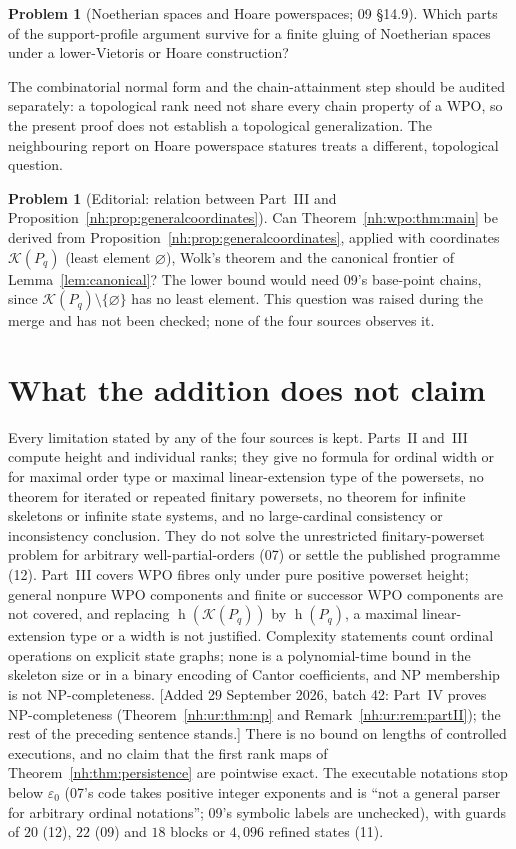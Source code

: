 \documentclass[11pt,a4paper]{article}
\theoremstyle{definition}
\newtheorem{problem}[theorem]{Problem}
\theoremstyle{remark}
\newcommand{\K}{\mathcal K}
\newcommand{\hgt}{\operatorname{h}}
\newcommand{\eps}{\varepsilon_0}
\begin{document}
\begin{problem}[Noetherian spaces and Hoare powerspaces; 09 \S14.9]
\label{nh:prob:noetherian}
Which parts of the support-profile argument survive for a finite gluing of
Noetherian spaces under a lower-Vietoris or Hoare construction?
\end{problem}
The combinatorial normal form and the chain-attainment step should be audited
separately: a topological rank need not share every chain property of a WPO, so the
present proof does not establish a topological generalization. The neighbouring
report on Hoare powerspace statures treats a different, topological question.

\begin{problem}[Editorial: relation between Part~III and Proposition~\ref{nh:prop:generalcoordinates}]
\label{nh:prob:editorial}
Can Theorem~\ref{nh:wpo:thm:main} be derived from
Proposition~\ref{nh:prop:generalcoordinates}, applied with coordinates
$\K(P_q)$ (least element $\varnothing$), Wolk's theorem and the canonical frontier of
Lemma~\ref{lem:canonical}? The lower bound would need 09's base-point chains, since
$\K(P_q)\setminus\{\varnothing\}$ has no least element. This question was raised
during the merge and has not been checked; none of the four sources observes it.
\end{problem}

\section{What the addition does not claim}\label{nh:sec:nonclaims}

Every limitation stated by any of the four sources is kept. Parts~II and~III compute
height and individual ranks; they give no formula for ordinal width or for maximal
order type or maximal linear-extension type of the powersets, no theorem for
iterated or repeated finitary powersets, no theorem for infinite skeletons or
infinite state systems, and no large-cardinal consistency or inconsistency
conclusion. They do not solve the unrestricted finitary-powerset problem for
arbitrary well-partial-orders (07) or settle the published programme (12). Part~III
covers WPO fibres only under pure positive powerset height; general nonpure WPO
components and finite or successor WPO components are not covered, and replacing
$\hgt(\K(P_q))$ by $\hgt(P_q)$, a maximal linear-extension type or a width is not
justified. Complexity statements count ordinal operations on explicit state graphs;
none is a polynomial-time bound in the skeleton size or in a binary encoding of
Cantor coefficients, and NP membership is not NP-completeness.
[Added 29 September 2026, batch 42: Part~IV proves NP-completeness
(Theorem~\ref{nh:ur:thm:np} and Remark~\ref{nh:ur:rem:partII}); the rest of
the preceding sentence stands.] There is no bound on
lengths of controlled executions, and no claim that the first rank maps of
Theorem~\ref{nh:thm:persistence} are pointwise exact. The executable notations stop
below $\eps$ (07's code takes positive integer exponents and is ``not a general
parser for arbitrary ordinal notations''; 09's symbolic labels are unchecked), with
guards of $20$ (12), $22$ (09) and $18$ blocks or $4{,}096$ refined states (11).
\end{document}
